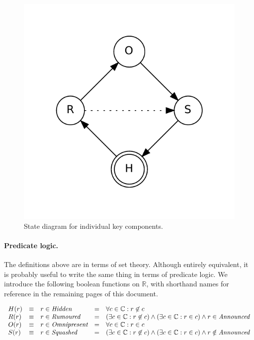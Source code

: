 \documentclass[twoside,english]{article}
\begin{document}
\begin{figure}[t]
	\centering
	\includegraphics[scale=0.5]{states.pdf}
	\caption{State diagram for individual key components.}
	\label{fig:states}
\end{figure}

\paragraph{Predicate logic.}
The definitions above are in terms of set theory.  Although entirely equivalent, it is
probably useful to write the same thing in terms of predicate logic.  We introduce the
following boolean functions on $\mathbb{R}$, with shorthand names for reference in the
remaining pages of this document.

\begin{displaymath}
\begin{array}{lllll}
       H(r) & \equiv & r\in\emph{Hidden} &=& \forall c \in \mathbb{C}: r \not \in c \\
       R(r) & \equiv & r\in\emph{Rumoured} &=& (\exists c \in \mathbb{C}: r \not \in c) \wedge (\exists c \in \mathbb{C}: r\in c) \wedge r\in\emph{Announced}\\
       O(r) & \equiv & r\in\emph{Omnipresent} &=& \forall c \in \mathbb{C}: r \in c \\
       S(r) & \equiv & r\in\emph{Squashed} &=& (\exists c \in \mathbb{C}: r \not \in c) \wedge (\exists c \in \mathbb{C}: r \in c)\wedge r\notin\emph{Announced} \\
\end{array}
\end{displaymath}
\end{document}
